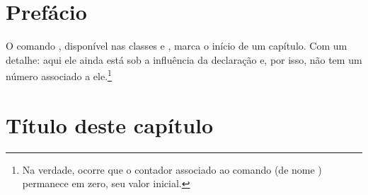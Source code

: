 \documentclass[a4paper,12pt]{book}
\begin{document}
	\tableofcontents
	
		
	
	\chapter{Prefácio}
	
	O comando , disponível nas classes  e , 
	marca o início de um capítulo. Com um detalhe: aqui ele ainda está sob a
	influência da declaração  e, por isso, não tem um número 
	associado a ele.\footnote{Na verdade, ocorre que o contador associado ao
	comando  (de nome ) permanece em zero, seu valor
	inicial.}
	
	\mainmatter
	\chapter{Título deste capítulo}\label{chap:intro}
	
\end{document}
